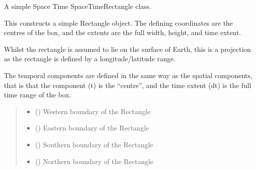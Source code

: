 \documentclass[letterpaper,10pt,english]{sphinxmanual}
\begin{document}

\begin{fulllineitems}
\label{\detokenize{users_guide:GeoSpatialTools.octtree.SpaceTimeRectangle}}
\pysigstartsignatures
\pysiglinewithargsret
{}
{\sphinxparamcomma {}\sphinxparamcomma {}\sphinxparamcomma {}\sphinxparamcomma {}\sphinxparamcomma {}}
{}
\pysigstopsignatures
\sphinxAtStartPar
A simple Space Time SpaceTimeRectangle class.

\sphinxAtStartPar
This constructs a simple Rectangle object.
The defining coordinates are the centres of the box, and the extents
are the full width, height, and time extent.

\sphinxAtStartPar
Whilst the rectangle is assumed to lie on the surface of Earth, this is
a projection as the rectangle is defined by a longitude/latitude range.

\sphinxAtStartPar
The temporal components are defined in the same way as the spatial
components, that is that the  component (t) is the “centre”, and
the time extent (dt) is the full time range of the box.
\begin{quote}\begin{description}
\begin{itemize}
\item {} 
\sphinxAtStartPar
{} () \textendash{} Western boundary of the Rectangle

\item {} 
\sphinxAtStartPar
{} () \textendash{} Eastern boundary of the Rectangle

\item {} 
\sphinxAtStartPar
{} () \textendash{} Southern boundary of the Rectangle

\item {} 
\sphinxAtStartPar
{} () \textendash{} Northern boundary of the Rectangle


\end{itemize}
\end{description}
\end{quote}
\end{fulllineitems}
\end{document}

